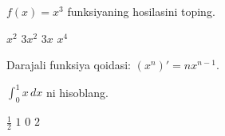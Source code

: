 \documentclass{exam}
\begin{document}
\begin{questions}
\question[5] $f(x)=x^3$ funksiyaning hosilasini toping.
\begin{choices}
\choice $x^2$
\CorrectChoice $3x^2$
\choice $3x$
\choice $x^4$
\end{choices}
\begin{solution}
Darajali funksiya qoidasi: $(x^n)'=nx^{n-1}$.
\end{solution}
\question $\int_0^1 x\,dx$ ni hisoblang.
\begin{choices}
\CorrectChoice $\frac12$
\choice $1$
\choice $0$
\choice $2$
\end{choices}
\end{questions}
\end{document}
